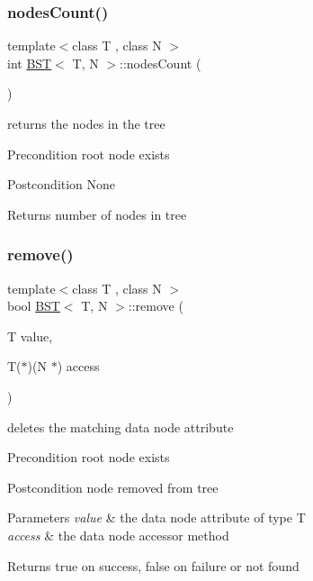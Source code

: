 \subsubsection{\texorpdfstring{nodes\+Count()}{nodesCount()}}
{\footnotesize\ttfamily template$<$class T , class N $>$ \\
int \hyperlink{class_b_s_t}{B\+ST}$<$ T, N $>$\+::nodes\+Count (\begin{DoxyParamCaption}{ }\end{DoxyParamCaption})}

returns the nodes in the tree \begin{DoxyPrecond}{Precondition}
root node exists 
\end{DoxyPrecond}
\begin{DoxyPostcond}{Postcondition}
None 
\end{DoxyPostcond}
\begin{DoxyReturn}{Returns}
number of nodes in tree 
\end{DoxyReturn}
\mbox{\label{class_b_s_t_aef5667b555733710dbe17aa7218e248d}} 
\subsubsection{\texorpdfstring{remove()}{remove()}}
{\footnotesize\ttfamily template$<$class T , class N $>$ \\
bool \hyperlink{class_b_s_t}{B\+ST}$<$ T, N $>$\+::remove (\begin{DoxyParamCaption}\item[{T}]{value,  }\item[{T($\ast$)(N $\ast$)}]{access }\end{DoxyParamCaption})}

deletes the matching data node attribute \begin{DoxyPrecond}{Precondition}
root node exists 
\end{DoxyPrecond}
\begin{DoxyPostcond}{Postcondition}
node removed from tree 
\end{DoxyPostcond}

\begin{DoxyParams}{Parameters}
{\em value} & the data node attribute of type T \\
\hline
{\em access} & the data node accessor method \\
\hline
\end{DoxyParams}
\begin{DoxyReturn}{Returns}
true on success, false on failure or not found 
\end{DoxyReturn}
\mbox{\label{class_b_s_t_a3e958de8a85c1268b11006a3ed32a7bb}} 
